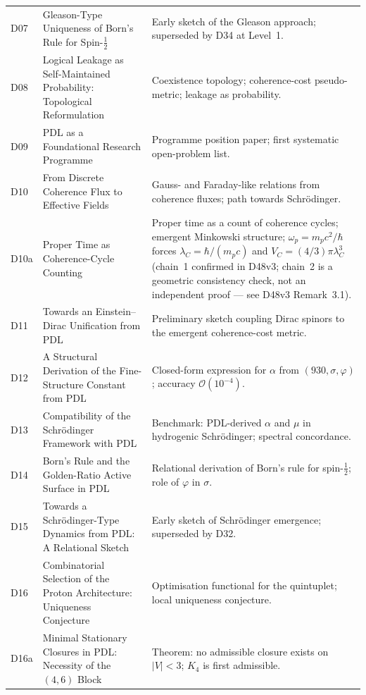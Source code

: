 \documentclass[11pt,a4paper]{article}
\theoremstyle{plain}
\theoremstyle{definition}
\theoremstyle{remark}
\begin{document}
\begin{longtable}{L{1.3cm}L{3.8cm}L{8.0cm}}
D07 & Gleason-Type Uniqueness of Born's Rule for Spin-$\tfrac{1}{2}$~\cite{D07} & Early sketch of the Gleason approach; superseded by D34 at Level~1.\\[0.3em]
D08 & Logical Leakage as Self-Maintained Probability: Topological Reformulation~\cite{D08} & Coexistence topology; coherence-cost pseudo-metric; leakage as probability.\\[0.3em]
D09 & PDL as a Foundational Research Programme~\cite{D09} & Programme position paper; first systematic open-problem list.\\[0.3em]
D10 & From Discrete Coherence Flux to Effective Fields~\cite{D10} & Gauss- and Faraday-like relations from coherence fluxes; path towards Schr\"odinger.\\[0.3em]
D10a & Proper Time as Coherence-Cycle Counting~\cite{D10a} & Proper time as a count of coherence cycles; emergent Minkowski structure; $\omega_p = m_p c^2/\hbar$ forces $\lambda_C = \hbar/(m_p c)$ and $V_C = (4/3)\pi\lambda_C^3$ (chain~1 confirmed in D48v3; chain~2 is a geometric consistency check, not an independent proof --- see D48v3 Remark~3.1).\\[0.3em]
D11 & Towards an Einstein--Dirac Unification from PDL~\cite{D11} & Preliminary sketch coupling Dirac spinors to the emergent coherence-cost metric.\\[0.3em]
D12 & A Structural Derivation of the Fine-Structure Constant from PDL~\cite{D12} & Closed-form expression for $\alpha$ from $(930, \sigma, \varphi)$; accuracy $\mathcal{O}(10^{-4})$.\\[0.3em]
D13 & Compatibility of the Schr\"odinger Framework with PDL~\cite{D13} & Benchmark: PDL-derived $\alpha$ and $\mu$ in hydrogenic Schr\"odinger; spectral concordance.\\[0.3em]
D14 & Born's Rule and the Golden-Ratio Active Surface in PDL~\cite{D14} & Relational derivation of Born's rule for spin-$\tfrac{1}{2}$; role of $\varphi$ in $\sigma$.\\[0.3em]
D15 & Towards a Schr\"odinger-Type Dynamics from PDL: A Relational Sketch~\cite{D15} & Early sketch of Schr\"odinger emergence; superseded by D32.\\[0.3em]
D16 & Combinatorial Selection of the Proton Architecture: Uniqueness Conjecture~\cite{D16} & Optimisation functional for the quintuplet; local uniqueness conjecture.\\[0.3em]
D16a & Minimal Stationary Closures in PDL: Necessity of the $(4,6)$ Block~\cite{D16a} & \textcolor{proofblue}{Theorem}: no admissible closure exists on $|V|<3$; $K_4$ is first admissible.\\[0.3em]

\end{longtable}
\end{document}

